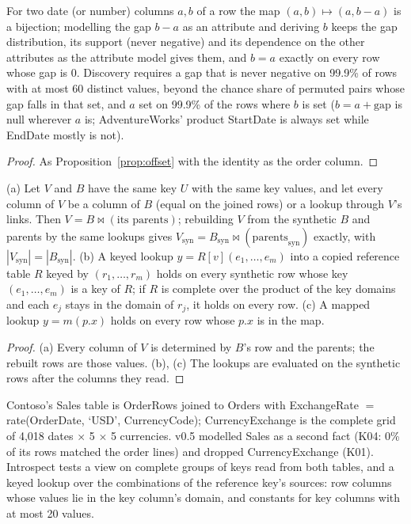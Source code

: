 \begin{proposition}\label{prop:coloffset}
For two date (or number) columns $a,b$ of a row the map $(a,b)\mapsto(a,b-a)$ is a bijection; modelling the gap $b-a$ as an attribute and deriving $b$ keeps the gap distribution, its support (never negative) and its dependence on the other attributes as the attribute model gives them, and $b=a$ exactly on every row whose gap is 0. Discovery requires a gap that is never negative on 99.9\% of rows with at most 60 distinct values, beyond the chance share of permuted pairs whose gap falls in that set, and $a$ set on 99.9\% of the rows where $b$ is set ($b=a+\text{gap}$ is null wherever $a$ is; AdventureWorks' product StartDate is always set while EndDate mostly is not).
\end{proposition}
\begin{proof}
As Proposition~\ref{prop:offset} with the identity as the order column.
\end{proof}

\begin{proposition}\label{prop:view}
(a) Let $V$ and $B$ have the same key $U$ with the same key values, and let every column of $V$ be a column of $B$ (equal on the joined rows) or a lookup through $V$'s links. Then $V=B\bowtie(\text{its parents})$; rebuilding $V$ from the synthetic $B$ and parents by the same lookups gives $V_{\mathrm{syn}}=B_{\mathrm{syn}}\bowtie(\text{parents}_{\mathrm{syn}})$ exactly, with $|V_{\mathrm{syn}}|=|B_{\mathrm{syn}}|$. (b) A keyed lookup $y=R[v](e_1,\dots,e_m)$ into a copied reference table $R$ keyed by $(r_1,\dots,r_m)$ holds on every synthetic row whose key $(e_1,\dots,e_m)$ is a key of $R$; if $R$ is complete over the product of the key domains and each $e_j$ stays in the domain of $r_j$, it holds on every row. (c) A mapped lookup $y=m(p.x)$ holds on every row whose $p.x$ is in the map.
\end{proposition}
\begin{proof}
(a) Every column of $V$ is determined by $B$'s row and the parents; the rebuilt rows are those values. (b), (c) The lookups are evaluated on the synthetic rows after the columns they read.
\end{proof}
\noindent Contoso's Sales table is OrderRows joined to Orders with ExchangeRate $=$ rate(OrderDate, `USD', CurrencyCode); CurrencyExchange is the complete grid of 4{,}018 dates $\times$ 5 $\times$ 5 currencies. v0.5 modelled Sales as a second fact (K04: 0\% of its rows matched the order lines) and dropped CurrencyExchange (K01). Introspect tests a view on complete groups of keys read from both tables, and a keyed lookup over the combinations of the reference key's sources: row columns whose values lie in the key column's domain, and constants for key columns with at most 20 values.

